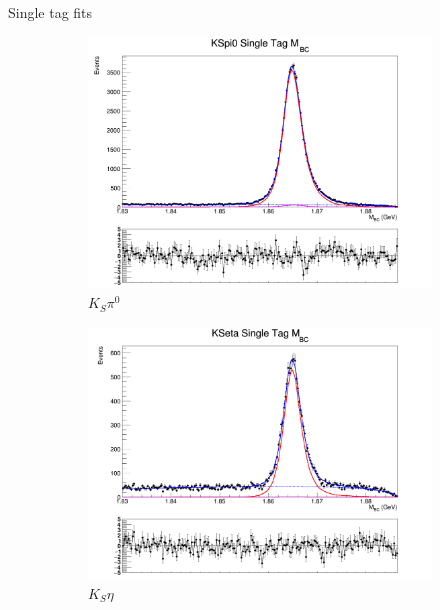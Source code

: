 \documentclass{beamer}
\begin{document}
\begin{frame}{Single tag fits}
  \begin{figure}
    \centering
    \begin{subfigure}{0.33\textwidth}
      \centering
      \includegraphics[width=1.0\textwidth]{Plots/KSpi0_SingleTag_MBC_Plot.png}
      \caption{$K_S\pi^0$}
    \end{subfigure}%
    \begin{subfigure}{0.33\textwidth}
      \centering
      \includegraphics[width=1.0\textwidth]{Plots/KSeta_SingleTag_MBC_Plot.png}
      \caption{$K_S\eta$}
    \end{subfigure}
    \begin{subfigure}{0.33\textwidth}
      \centering

\end{subfigure}
\end{figure}
\end{frame}
\end{document}
